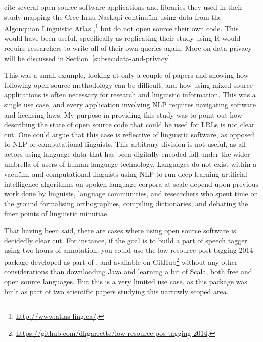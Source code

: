 \citet{cenerini2017mapping} cite several open source software applications and libraries they used in their study mapping the Cree-Innu-Naskapi continu\"{u}m using data from the Algonquian Linguistic Atlas \citep{junker2011linguistic},\footnote{\href{http://www.atlas-ling.ca/}{http://www.atlas-ling.ca/}. } but do not open source their own code. This would have been useful, specifically as replicating their study using R \citep{ihaka1996r} would require researchers to write all of their own queries again. More on data privacy will be discussed in Section~\ref{subsec:data-and-privacy}.

This was a small example, looking at only a couple of papers and showing how following open source methodology can be difficult, and how using mixed source applications is often necessary for research and linguistic information. This was a single use case, and every application involving NLP requires navigating software and licensing laws. My purpose in providing this study was to point out how describing the state of open source code that could be used for LRLs is not clear cut. One could argue that this case is reflective of linguistic software, as opposed to NLP or computational linguists. This arbitrary division is not useful, as all actors using language data that has been digitally encoded fall under the wider umbrella of users of human language technology. Languages do not exist within a vacu\"{u}m, and computational linguists using NLP to run deep learning artificial intelligence algorithms on spoken language corpora at scale depend upon previous work done by linguists, language communities, and researchers who spent time on the ground formalising orthographies, compiling dictionaries, and debating the finer points of linguistic minutiae.

That having been said, there are cases where using open source software is decidedly clear cut. For instance, if the goal is to build a part of speech tagger using two hours of annotation, you could use the low-resource-post-tagging-2014 package developed as part of \citet{garrette2013real,garrette2013learning}, and available on GitHub\footnote{\href{https://github.com/dhgarrette/low-resource-pos-tagging-2014}{https://github.com/dhgarrette/low-resource-pos-tagging-2014}. } without any other considerations than downloading Java and learning a bit of Scala, both free and open source languages. But this is a very limited use case, as this package was built as part of two scientific papers studying this narrowly scoped area.

